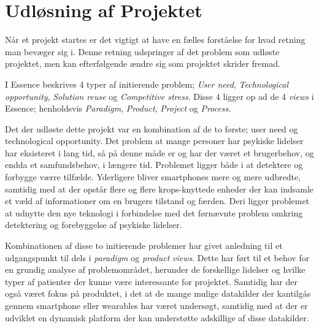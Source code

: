 \section{Udløsning af Projektet}
Når et projekt startes er det vigtigt at have en fælles forståelse for hvad retning man bevæger sig i.
Denne retning udspringer af det problem som udløste projektet, men kan efterfølgende ændre sig som projektet skrider fremad.

I Essence beskrives 4 typer af initierende problem; \textit{User need}, \textit{Technological opportunity}, \textit{Solution reuse} og \textit{Competitive stress}.
Disse 4 ligger op ad de 4 \textit{views} i Essence; henholdsvis \textit{Paradigm}, \textit{Product}, \textit{Project} og \textit{Process}.

Det der udløste dette projekt var en kombination af de to første; user need og technological opportunity.
Det problem at mange personer har psykiske lidelser har eksisteret i lang tid, så på denne måde er og har der været et brugerbehov, og endda et samfundsbehov, i længere tid.
Problemet ligger både i at detektere og forbygge værre tilfælde.
Yderligere bliver smartphones mere og mere udbredte, samtidig med at der opstår flere og flere krops-knyttede enheder der kan indsamle et væld af informationer om en brugers tilstand og færden.
Deri ligger problemet at udnytte den nye teknologi i forbindelse med det førnævnte problem omkring detektering og forebyggelse af psykiske lidelser.

Kombinationen af disse to initierende problemer har givet anledning til et udgangspunkt til dels i \textit{paradigm} og \textit{product} \textit{views}.
Dette har ført til et behov for en grundig analyse af problemområdet, herunder de forskellige lidelser og hvilke typer af patienter der kunne være interessante for projektet.
Samtidig har der også været fokus på produktet, i det at de mange mulige datakilder der kantilgås gennem smartphone eller wearables har været undersøgt, samtidig med at der er udviklet en dynamisk platform der kan understøtte adskillige af disse datakilder.
